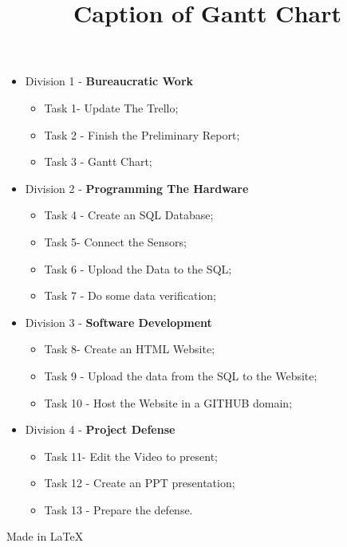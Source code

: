 \documentclass{article}
\begin{document}
\title{\textbf{Caption of Gantt Chart}} \hfill \break
\begin{itemize}
    \item Division 1 - \textbf{Bureaucratic Work}
    \begin{itemize}
        \item Task 1- Update The Trello;
        \item Task 2 - Finish the Preliminary Report;
        \item Task 3 - Gantt Chart;
    \end{itemize}
    \item Division 2 - \textbf{Programming The Hardware}
    \begin{itemize}
        \item Task 4 - Create an SQL Database;
        \item Task 5- Connect the Sensors;
        \item Task 6 - Upload the Data to the SQL;
        \item Task 7 - Do some data verification;
    \end{itemize}
    \item Division 3 - \textbf{Software Development}
    \begin{itemize}
        \item Task 8- Create an HTML Website;
        \item Task 9 - Upload the data from the SQL to the Website;
        \item Task 10 - Host the Website in a GITHUB domain;
    \end{itemize}
    \item Division 4 - \textbf{Project Defense}
    \begin{itemize}
        \item Task 11- Edit the Video to present;
        \item Task 12 - Create an PPT presentation;
        \item Task 13 - Prepare the defense.
    \end{itemize}
    
\end{itemize}
\vfill{Made in \LaTeX}
\end{document}
